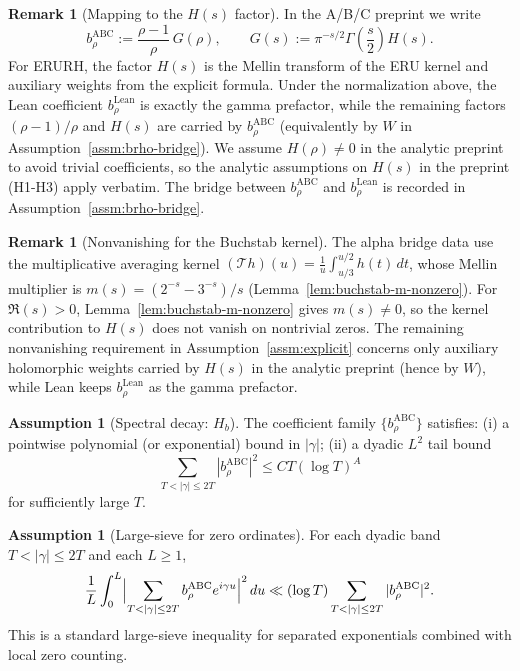 \documentclass[11pt]{article}
\theoremstyle{plain}
\theoremstyle{definition}
\newtheorem{assumption}[theorem]{Assumption}
\newtheorem{remark}[theorem]{Remark}
\newcommand{\brhoLean}{b_\rho^{\mathrm{Lean}}}
\newcommand{\brhoABC}{b_\rho^{\mathrm{ABC}}}
\begin{document}
\begin{remark}[Mapping to the $H(s)$ factor]\label{rem:Hs-mapping}
In the A/B/C preprint we write
\[
  \brhoABC := \frac{\rho-1}{\rho}\,G(\rho),
  \qquad
  G(s) := \pi^{-s/2}\Gamma\!\left(\frac{s}{2}\right)H(s).
\]
For ERURH, the factor $H(s)$ is the Mellin transform of the ERU kernel and
auxiliary weights from the explicit formula. Under the normalization above,
the Lean coefficient $\brhoLean$ is exactly the gamma prefactor, while the
remaining factors $(\rho-1)/\rho$ and $H(s)$ are carried by $\brhoABC$
(equivalently by $W$ in Assumption~\ref{assm:brho-bridge}). We
assume $H(\rho)\neq 0$ in the analytic preprint to avoid trivial coefficients,
so the analytic assumptions on $H(s)$ in the preprint (H1-H3) apply verbatim.
The bridge between $\brhoABC$ and $\brhoLean$ is recorded in
Assumption~\ref{assm:brho-bridge}.
\end{remark}

\begin{remark}[Nonvanishing for the Buchstab kernel]\label{rem:buchstab-H-nonzero}
The alpha bridge data use the multiplicative averaging kernel
$(\mathcal{T}h)(u)=\frac{1}{u}\int_{u/3}^{u/2} h(t)\,dt$, whose Mellin multiplier is
$m(s)=(2^{-s}-3^{-s})/s$ (Lemma~\ref{lem:buchstab-m-nonzero}). For $\Re(s)>0$,
Lemma~\ref{lem:buchstab-m-nonzero} gives $m(s)\neq 0$, so the kernel contribution
to $H(s)$ does not vanish on nontrivial zeros. The remaining nonvanishing
requirement in Assumption~\ref{assm:explicit} concerns only auxiliary holomorphic
weights carried by $H(s)$ in the analytic preprint (hence by $W$), while Lean
keeps $\brhoLean$ as the gamma prefactor.
\end{remark}

\begin{assumption}[Spectral decay: $H_b$]\label{assm:hb}
The coefficient family $\{\brhoABC\}$ satisfies:
(i) a pointwise polynomial (or exponential) bound in $|\gamma|$;
(ii) a dyadic $L^2$ tail bound
\[\sum_{T<|\gamma|\le 2T} |\brhoABC|^2 \le C T (\log T)^A\]
for sufficiently large $T$.
\end{assumption}

\begin{assumption}[Large-sieve for zero ordinates]\label{assm:ls}
For each dyadic band $T<|\gamma|\le 2T$ and each $L\ge 1$,
\[\frac{1}{L}\int_0^L\Bigl|\sum_{T<|\gamma|\le 2T} \brhoABC e^{i\gamma u}\Bigr|^2\,du
  \ll (\log T)\sum_{T<|\gamma|\le 2T}|\brhoABC|^2.\]
This is a standard large-sieve inequality for separated exponentials combined
with local zero counting.
\end{assumption}
\end{document}
